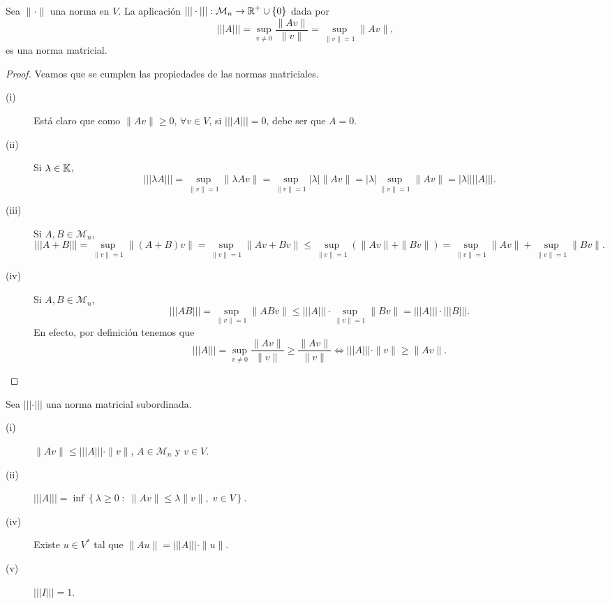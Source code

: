 \documentclass{article}
\begin{document}
\begin{prop}
	Sea $\displaystyle \| \cdot \|  $ una norma en $\displaystyle V $. La aplicación $\displaystyle | | | \cdot | | | : \mathcal{M}_{n} \to \mathbb{R}^{+}\cup \left\{ 0\right\}  $ dada por 
	\[ | | | A | | | = \sup_{v \neq 0}\frac{\| Av \|}{\|v\|} = \sup_{\|v\|=1}\|Av\| ,\]
	es una norma matricial.
\end{prop}
\begin{proof}
Veamos que se cumplen las propiedades de las normas matriciales.
\begin{description}
\item[(i)] Está claro que como $\displaystyle \| A v\| \geq 0 $, $\displaystyle \forall v \in V $, si $\displaystyle | | | A | | | = 0 $, debe ser que $\displaystyle A = 0$.
\item[(ii)] Si $\displaystyle \lambda \in \mathbb{K} $, 
	\[| | | \lambda A | | | = \sup_{\|v\| = 1}\|\lambda Av\| = \sup_{\|v\| = 1} \left|\lambda \right|\|Av\| = \left|\lambda \right|\sup_{\|v\| = 1} \|Av\| = \left|\lambda \right| | | | A | | | .\]
\item[(iii)] Si $\displaystyle A,B \in \mathcal{M}_{n} $,
	\[ | | | A + B | | | = \sup_{\|v\| = 1}\| \left(A + B\right) v \| = \sup_{\|v\| = 1} \| A v + Bv \| \leq \sup_{\|v\| = 1}\left(\|Av\|+\|Bv\|\right) = \sup_{\|v\| = 1}\|Av\| + \sup_{\|v\| = 1}\|Bv\| .\]
\item[(iv)] Si $\displaystyle A,B \in \mathcal{M}_{n} $,
	\[| | | AB | | | = \sup_{\|v\| = 1}\|ABv\| \leq | | | A | | | \cdot \sup_{\|v\| = 1}\|Bv\| = | | | A | | | \cdot | | | B | | | .\]
	En efecto, por definición tenemos que 
	\[ | | | A | | | = \sup_{v \neq 0}\frac{\|Av\|}{\|v\|} \geq \frac{\|Av\|}{\|v\|} \iff | | | A | | | \cdot \|v\| \geq \|Av\| .\]
\end{description}
\end{proof}
\begin{prop}
Sea $\displaystyle | | | \cdot | | | $ una norma matricial subordinada.
\begin{description}
\item[(i)] $\displaystyle \|Av\| \leq | | | A | | | \cdot  \|v\| $, $\displaystyle A \in \mathcal{M}_{n} $ y $\displaystyle v \in V $.
\item[(ii)] $\displaystyle | | | A | | | = \inf \left\{ \lambda \geq 0 \; : \; \|Av\| \leq \lambda \|v\|, \; v \in V\right\}  $.
\item[(iv)] Existe $\displaystyle u \in V^{*} $ tal que $\displaystyle \|Au\| = | | | A | | | \cdot \|u\| $.
\item[(v)] $\displaystyle | | | I | | | = 1 $.
\end{description}
\end{prop}
\end{document}
